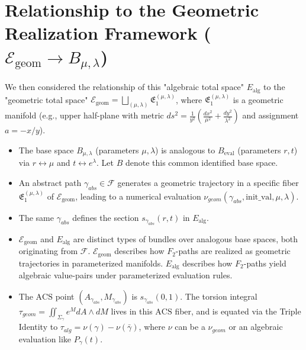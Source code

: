 \documentclass{article}[a4paper,12pt]
\begin{document}
\section{Relationship to the Geometric Realization Framework ($\mathcal{E}_{\text{geom}} \to B_{\mu,\lambda}$)}

We then considered the relationship of this "algebraic total space" $E_{\text{alg}}$ to the "geometric total space" $\mathcal{E}_{\text{geom}} = \bigsqcup_{(\mu,\lambda)} \mathfrak{E}_1^{(\mu,\lambda)}$, where $\mathfrak{E}_1^{(\mu,\lambda)}$ is a geometric manifold (e.g., upper half-plane with metric $ds^2 = \frac{1}{y^2}(\frac{dx^2}{\mu^2} + \frac{dy^2}{\lambda^2})$ and assignment $a=-x/y$).
\begin{itemize}
    \item The base space $B_{\mu,\lambda}$ (parameters $\mu, \lambda$) is analogous to $B_{\text{eval}}$ (parameters $r,t$) via $r \leftrightarrow \mu$ and $t \leftrightarrow e^\lambda$. Let $B$ denote this common identified base space.
    \item An abstract path $\gamma_{abs} \in \mathcal{F}$ generates a geometric trajectory in a specific fiber $\mathfrak{E}_1^{(\mu,\lambda)}$ of $\mathcal{E}_{\text{geom}}$, leading to a numerical evaluation $\nu_{geom}(\gamma_{abs}, \text{init\_val}, \mu, \lambda)$.
    \item The same $\gamma_{abs}$ defines the section $s_{\gamma_{abs}}(r,t)$ in $E_{\text{alg}}$.
    \item $\mathcal{E}_{\text{geom}}$ and $E_{\text{alg}}$ are distinct types of bundles over analogous base spaces, both originating from $\mathcal{F}$. $\mathcal{E}_{\text{geom}}$ describes how $F_2$-paths are realized as geometric trajectories in parameterized manifolds. $E_{\text{alg}}$ describes how $F_2$-paths yield algebraic value-pairs under parameterized evaluation rules.
    \item The $\mathrm{ACS}$ point $(A_{\gamma_{abs}}, M_{\gamma_{abs}})$ is $s_{\gamma_{abs}}(0,1)$. The torsion integral $\tau_{geom} = \iint_{\Sigma_\gamma} e^M dA \wedge dM$ lives in this $\mathrm{ACS}$ fiber, and is equated via the Triple Identity to $\tau_{alg} = \nu(\gamma) - \nu(\bar{\gamma})$, where $\nu$ can be a $\nu_{geom}$ or an algebraic evaluation like $P_\gamma(t)$.
\end{itemize}
\end{document}
